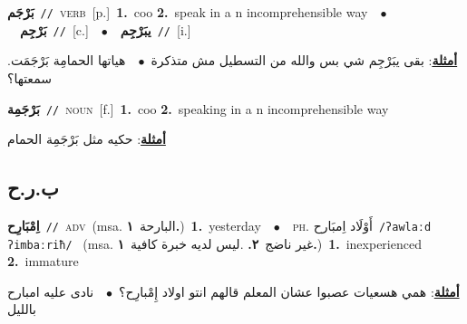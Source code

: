 \documentclass[10pt,a4paper,twoside]{article} %
\begin{document}
\begin{multicols}{2}
{\setlength\topsep{0pt}\textbf{\foreignlanguage{arabic}{بَرْجَم}}\ {\color{gray}\texttt{//}\color{black}}\ \textsc{verb}\ [p.]\ \textbf{1.}~coo  \textbf{2.}~speak in a n incomprehensible way\ \ $\bullet$\ \ \setlength\topsep{0pt}\textbf{\foreignlanguage{arabic}{بَرْجِم}}\ {\color{gray}\texttt{//}\color{black}}\ [c.]\ \ $\bullet$\ \ \setlength\topsep{0pt}\textbf{\foreignlanguage{arabic}{يبَرْجِم}}\ {\color{gray}\texttt{//}\color{black}}\ [i.]\  \begin{flushright}\color{gray}\foreignlanguage{arabic}{\textbf{\underline{\foreignlanguage{arabic}{أمثلة}}}: بقى يبَرْجِم شي بس والله من التسطيل مش متذكرة\ $\bullet$\ \  هياتها الحمامِة بَرْجَمَت. سمعتها؟}\end{flushright}\color{black}} \vspace{2mm}

{\setlength\topsep{0pt}\textbf{\foreignlanguage{arabic}{بَرْجَمِة}}\ {\color{gray}\texttt{//}\color{black}}\ \textsc{noun}\ [f.]\ \textbf{1.}~coo  \textbf{2.}~speaking in a n incomprehensible way\  \begin{flushright}\color{gray}\foreignlanguage{arabic}{\textbf{\underline{\foreignlanguage{arabic}{أمثلة}}}: حكيه مثل بَرْجَمِة الحمام}\end{flushright}\color{black}} \vspace{2mm}

\vspace{-3mm}
\subsection*{\color{blue}\foreignlanguage{arabic}{ب.ر.ح}\color{blue}{}} 

{\setlength\topsep{0pt}\textbf{\foreignlanguage{arabic}{اِمْبَارِح}}\ {\color{gray}\texttt{//}\color{black}}\ \textsc{adv}\ \color{gray}(msa. \foreignlanguage{arabic}{البارحة}~\foreignlanguage{arabic}{\textbf{١.}})\color{black}\ \textbf{1.}~yesterday\ \ $\bullet$\ \ \textsc{ph.} \color{gray} \foreignlanguage{arabic}{أَوْلَاد اِمبَارح}\color{black}\ {\color{gray}\texttt{/{\sffamily ʔawlaːd ʔimbaːriħ}/}\color{black}}\ \color{gray} (msa. \foreignlanguage{arabic}{غير ناضج}~\foreignlanguage{arabic}{\textbf{٢.}}  .\foreignlanguage{arabic}{ليس لديه خبرة كافية}~\foreignlanguage{arabic}{\textbf{١.}})\color{black}\ \textbf{1.}~inexperienced  \textbf{2.}~immature\  \begin{flushright}\color{gray}\foreignlanguage{arabic}{\textbf{\underline{\foreignlanguage{arabic}{أمثلة}}}: همي هسعيات عصبوا عشان المعلم قالهم انتو اولاد إِمْبارِح؟\ $\bullet$\ \  نادى عليه امبارح بالليل}\end{flushright}\color{black}} \vspace{2mm}


\end{multicols}
\end{document}
